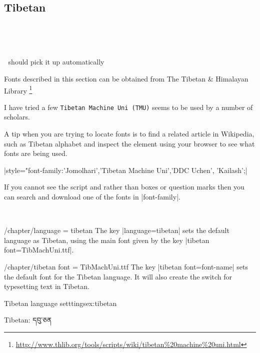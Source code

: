 \subsection{Tibetan}

^^A\newfontfamily{}

^^A\newfontfamily{}

^^A should pick it up automatically \tibetan

Fonts described in this section can be obtained from The Tibetan \& Himalayan Library
\footnote{\url{http://www.thlib.org/tools/scripts/wiki/tibetan%20machine%20uni.html}  }

I have tried a few \texttt{Tibetan Machine Uni (TMU)} seems to be used by a number of scholars. 

A tip when you are trying to locate fonts is to find a related article in Wikipedia, such as Tibetan alphabet and inspect the element using your browser to see what fonts are being used.


|style="font-family:'Jomolhari','Tibetan Machine Uni','DDC Uchen', 'Kailash';| 


If you cannot see the script and rather than boxes or question marks then you can search and download one of the fonts in |font-family|.

\def\tibetandefaultfont#1{\newfontfamily\tibetan[Language=Tibetan]{#1}}


\cxset{tibetan font/.code=\tibetandefaultfont{#1}}


^^A




\begin{key}{/chapter/language = tibetan} The key |language=tibetan| sets the default language as Tibetan, using the main font given by the key |tibetan font=TibMachUni.ttf|.
\end{key}

\begin{key}{/chapter/tibetan font = TibMachUni.ttf} The key |tibetan font=font-name| sets the default font for the Tibetan language. It will also create the switch \cmd{\tibetan} for typesetting text in Tibetan.
\end{key}

\begin{texexample}{Tibetan language setttings}{ex:tibetan}
\tibetan

\tibetan Tibetan: དབུ་ཅན
\end{texexample}



